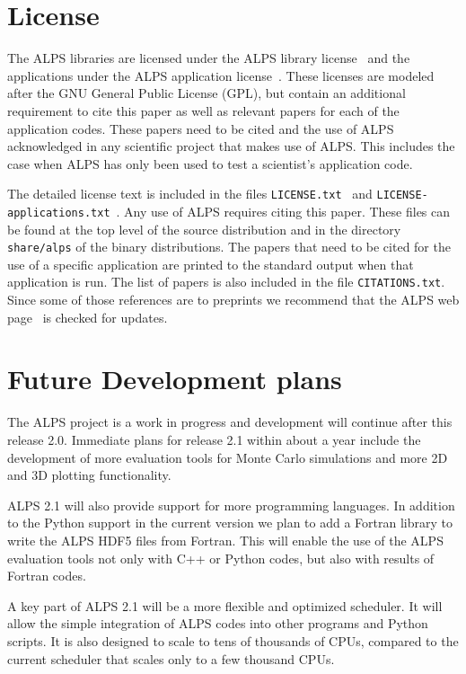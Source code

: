 \documentclass[12pt]{iopart}
\begin{document}
\section{License}
The ALPS libraries are licensed under the ALPS library license~\cite{librarylicense} and the applications under the ALPS application license~\cite{applicationlicense}. These licenses are modeled after the GNU General Public License (GPL), but contain an additional requirement to cite this paper as well as relevant papers for each of the application codes. These papers need to be cited and the use of ALPS acknowledged in any scientific project that makes use of ALPS. This includes the case when ALPS has only been used to test a scientist's application code.

The detailed license text is included in the files {\tt LICENSE.txt}~\cite{librarylicense} and {\tt LICENSE-applications.txt}~\cite{applicationlicense}. Any use of ALPS requires citing this paper. These files can be found at the top level of the source distribution and in the directory {\tt share/alps} of the binary distributions. The papers that need to be cited for the use of a specific application are printed to the standard output when that application is run. The list of papers is also included in the file {\tt CITATIONS.txt}. Since some of those references are to preprints we recommend that the ALPS web page~\cite{alps} is checked for updates.

\section{Future Development plans}

The ALPS project is a work in progress and development will continue after this release 2.0. Immediate plans for release 2.1 within about a year include the development of more evaluation tools for Monte Carlo simulations and more 2D and 3D plotting functionality.

ALPS 2.1 will also provide support for more programming languages. In addition to the Python support in the current version we plan to add a Fortran library to write the ALPS HDF5 files from Fortran. This will enable the use of the ALPS evaluation tools not only with C++ or Python codes, but also with results of Fortran codes.

A key part of ALPS 2.1 will be a more flexible and optimized scheduler. It will allow the simple integration of ALPS codes into other programs and Python scripts. It is also designed to scale to tens of thousands of CPUs, compared to the current scheduler that scales only to a few thousand CPUs. 
\end{document}
